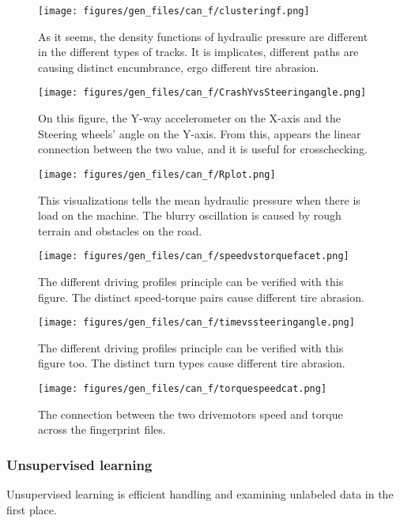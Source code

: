 		\begin{figure}[H]
			\centering
			\texttt{[image: figures/gen\_files/can\_f/clusteringf.png]}
			\caption{As it seems, the density functions of hydraulic pressure are different in the different types of tracks. It is implicates, different paths are causing distinct encumbrance, ergo different tire abrasion.} 
			\end{figure}
		\begin{figure}[H]
			\centering
			\texttt{[image: figures/gen\_files/can\_f/CrashYvsSteeringangle.png]}
			\caption{On this figure, the Y-way accelerometer on the X-axis and the Steering wheels' angle on the Y-axis. From this, appears the linear connection between the two value, and it is useful for crosschecking.} 
			\end{figure}
		\begin{figure}[H]
			\centering
			\texttt{[image: figures/gen\_files/can\_f/Rplot.png]}
			\caption{This visualizations tells the mean hydraulic pressure when there is load on the machine. The blurry oscillation is caused by rough terrain and obstacles on the road.} 
			\end{figure}		
		\begin{figure}[H]
			\centering
			\texttt{[image: figures/gen\_files/can\_f/speedvstorquefacet.png]}
			\caption{The different driving profiles principle can be verified with this figure. The distinct speed-torque pairs cause different tire abrasion.} 
			\end{figure}	
		\begin{figure}[H]
			\centering
			\texttt{[image: figures/gen\_files/can\_f/timevssteeringangle.png]}
			\caption{The different driving profiles principle can be verified with this figure too. The distinct turn types cause different tire abrasion.} 
			\end{figure}	
		\begin{figure}[H]
			\centering
			\texttt{[image: figures/gen\_files/can\_f/torquespeedcat.png]}
			\caption{The connection between the two drivemotors speed and torque across the fingerprint files.} 
			\end{figure}		
	\subsubsection{Unsupervised learning}
	Unsupervised learning is efficient handling and examining unlabeled data in the first place.
	
